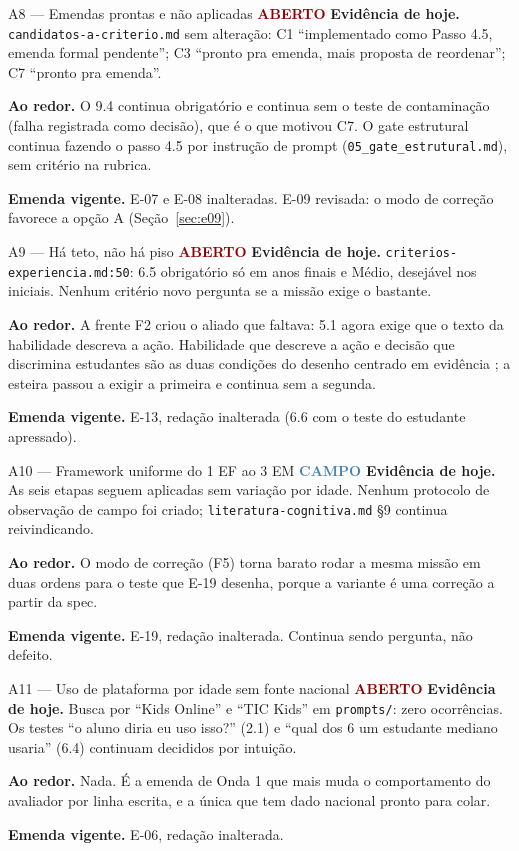 \documentclass[11pt,a4paper]{article}
\newcommand{\aberto}{\textcolor{DarkRed}{\textbf{ABERTO}}}
\newcommand{\campo}{\textcolor{SteelBlue}{\textbf{CAMPO}}}
\begin{document}
\begin{achadobox}{A8 --- Emendas prontas e não aplicadas \hfill \aberto}
\textbf{Evidência de hoje.} \texttt{candidatos-a-criterio.md} sem alteração: C1 ``implementado como
Passo 4.5, emenda formal pendente''; C3 ``pronto pra emenda, mais proposta de reordenar''; C7
``pronto pra emenda''.

\textbf{Ao redor.} O 9.4 continua obrigatório e continua sem o teste de contaminação (falha
registrada como decisão), que é o que motivou C7. O gate estrutural continua fazendo o passo 4.5
por instrução de prompt (\texttt{05\_gate\_estrutural.md}), sem critério na rubrica.

\textbf{Emenda vigente.} E-07 e E-08 inalteradas. E-09 revisada: o modo de correção favorece a opção
A (Seção~\ref{sec:e09}).
\end{achadobox}

\begin{achadobox}{A9 --- Há teto, não há piso \hfill \aberto}
\textbf{Evidência de hoje.} \texttt{criterios-experiencia.md:50}: 6.5 obrigatório só em anos finais
e Médio, desejável nos iniciais. Nenhum critério novo pergunta se a missão exige o bastante.

\textbf{Ao redor.} A frente F2 criou o aliado que faltava: 5.1 agora exige que o texto da
habilidade descreva a ação. Habilidade que descreve a ação e decisão que discrimina estudantes são
as duas condições do desenho centrado em evidência \cite{mislevy2003}; a esteira passou a exigir a
primeira e continua sem a segunda.

\textbf{Emenda vigente.} E-13, redação inalterada (6.6 com o teste do estudante apressado).
\end{achadobox}

\begin{achadobox}{A10 --- Framework uniforme do 1\textordmasculine{} EF ao 3\textordmasculine{} EM \hfill \campo}
\textbf{Evidência de hoje.} As seis etapas seguem aplicadas sem variação por idade. Nenhum protocolo
de observação de campo foi criado; \texttt{literatura-cognitiva.md} \S9 continua reivindicando.

\textbf{Ao redor.} O modo de correção (F5) torna barato rodar a mesma missão em duas ordens para o
teste que E-19 desenha, porque a variante é uma correção a partir da spec.

\textbf{Emenda vigente.} E-19, redação inalterada. Continua sendo pergunta, não defeito.
\end{achadobox}

\begin{achadobox}{A11 --- Uso de plataforma por idade sem fonte nacional \hfill \aberto}
\textbf{Evidência de hoje.} Busca por ``Kids Online'' e ``TIC Kids'' em \texttt{prompts/}: zero
ocorrências. Os testes ``o aluno diria eu uso isso?'' (2.1) e ``qual dos 6 um estudante mediano
usaria'' (6.4) continuam decididos por intuição.

\textbf{Ao redor.} Nada. É a emenda de Onda 1 que mais muda o comportamento do avaliador por linha
escrita, e a única que tem dado nacional pronto para colar.

\textbf{Emenda vigente.} E-06, redação inalterada.
\end{achadobox}
\end{document}
